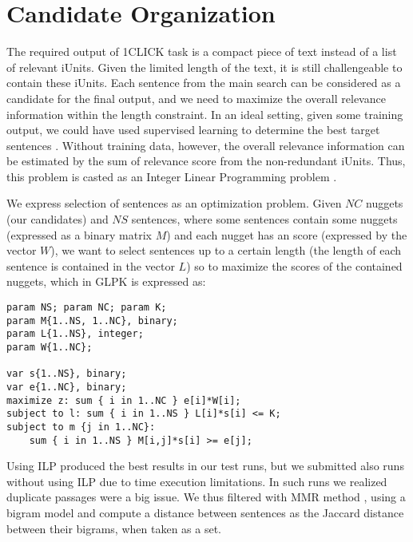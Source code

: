 \section{Candidate Organization}
\label{sec:candidates}

The required output of 1CLICK task is a compact piece of text instead
of a list of relevant iUnits.  Given the limited length of the text,
it is still challengeable to contain these iUnits.  Each sentence from
the main search can be considered as a candidate for the final output,
and we need to maximize the overall relevance information within the
length constraint.  In an ideal setting, given some training output,
we could have used supervised learning to determine the best target
sentences \cite{Gondek_al:12}. Without training data, however, the
overall relevance information can be estimated by the sum of relevance
score from the non-redundant iUnits.  Thus, this problem is casted as
an Integer Linear Programming problem \cite{McDonald_ECIR07}.

We express selection of sentences as an optimization problem. Given
$NC$ nuggets (our candidates) and $NS$ sentences, where some sentences
contain some nuggets (expressed as a binary matrix $M$) and each
nugget has an score (expressed by the vector $W$), we want to select
sentences up to a certain length (the length of each sentence is
contained in the vector $L$) so to maximize the scores of the
contained nuggets, which in GLPK \cite{Makhorin/00/GLPK} is expressed as:

\begin{verbatim}
param NS; param NC; param K; 
param M{1..NS, 1..NC}, binary; 
param L{1..NS}, integer; 
param W{1..NC};

var s{1..NS}, binary; 
var e{1..NC}, binary;
maximize z: sum { i in 1..NC } e[i]*W[i];
subject to l: sum { i in 1..NS } L[i]*s[i] <= K;
subject to m {j in 1..NC}: 
    sum { i in 1..NS } M[i,j]*s[i] >= e[j];
\end{verbatim}

Using ILP produced the best results in our test runs, but we submitted
also runs without using ILP due to time execution limitations. In such
runs we realized duplicate passages were a big issue. We thus
filtered with MMR method \cite{Carbonell&Goldstein98}, using a bigram model and compute a distance between sentences
as the Jaccard distance \cite{Jaccard} between their bigrams, when
taken as a set.

